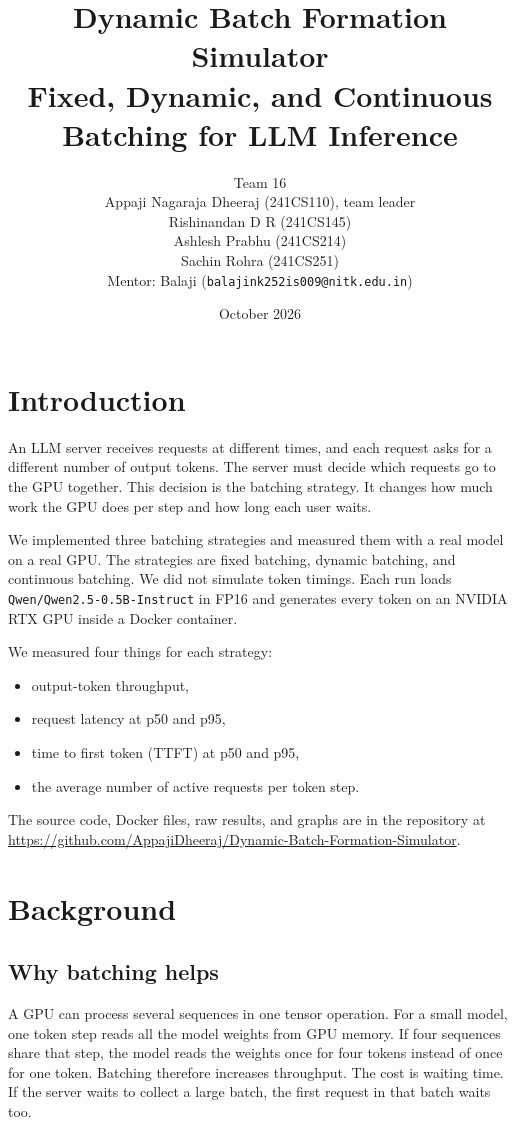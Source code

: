 \documentclass[12pt,a4paper]{article}
\title{Dynamic Batch Formation Simulator \\
Fixed, Dynamic, and Continuous Batching for LLM Inference}
\author{
Team 16 \\[4pt]
Appaji Nagaraja Dheeraj (241CS110), team leader \\
Rishinandan D R (241CS145) \\
Ashlesh Prabhu (241CS214) \\
Sachin Rohra (241CS251) \\[4pt]
Mentor: Balaji (\texttt{balajink252is009@nitk.edu.in})
}
\date{October 2026}
\begin{document}
\maketitle

\section{Introduction}
An LLM server receives requests at different times, and each request asks for a different number of output tokens. The server must decide which requests go to the GPU together. This decision is the batching strategy. It changes how much work the GPU does per step and how long each user waits.

We implemented three batching strategies and measured them with a real model on a real GPU. The strategies are fixed batching, dynamic batching, and continuous batching. We did not simulate token timings. Each run loads \texttt{Qwen/Qwen2.5-0.5B-Instruct} in FP16 and generates every token on an NVIDIA RTX GPU inside a Docker container.

We measured four things for each strategy:
\begin{itemize}
    \item output-token throughput,
    \item request latency at p50 and p95,
    \item time to first token (TTFT) at p50 and p95,
    \item the average number of active requests per token step.
\end{itemize}

The source code, Docker files, raw results, and graphs are in the repository at \url{https://github.com/AppajiDheeraj/Dynamic-Batch-Formation-Simulator}.

\section{Background}

\subsection{Why batching helps}
A GPU can process several sequences in one tensor operation. For a small model, one token step reads all the model weights from GPU memory. If four sequences share that step, the model reads the weights once for four tokens instead of once for one token. Batching therefore increases throughput. The cost is waiting time. If the server waits to collect a large batch, the first request in that batch waits too.
\end{document}
